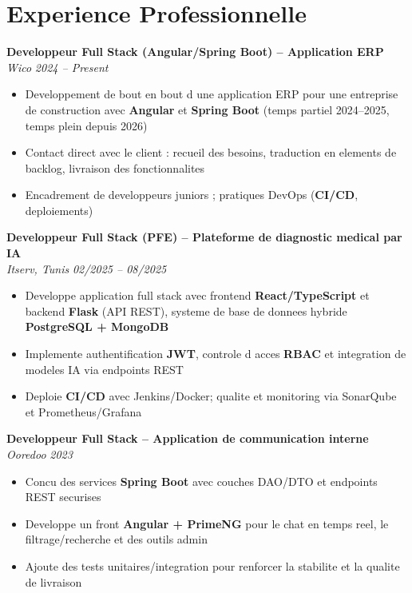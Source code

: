 \documentclass[10pt,a4paper]{article}
\begin{document}
\vspace{6pt}

\section*{Experience Professionnelle}
{\small

\textbf{Developpeur Full Stack (Angular/Spring Boot) -- Application ERP}\\[1pt]
\textit{Wico} \hfill \textit{2024 -- Present}
\begin{itemize}
  \item Developpement de bout en bout d une application ERP pour une entreprise de construction avec \textbf{Angular} et \textbf{Spring Boot} (temps partiel 2024--2025, temps plein depuis 2026)
  \item Contact direct avec le client : recueil des besoins, traduction en elements de backlog, livraison des fonctionnalites
  \item Encadrement de developpeurs juniors ; pratiques DevOps (\textbf{CI/CD}, deploiements)
\end{itemize}

\vspace{3pt}
\textbf{Developpeur Full Stack (PFE) -- Plateforme de diagnostic medical par IA}\\[1pt]
\textit{Itserv, Tunis} \hfill \textit{02/2025 -- 08/2025}
\begin{itemize}
  \item Developpe application full stack avec frontend \textbf{React/TypeScript} et backend \textbf{Flask} (API REST), systeme de base de donnees hybride \textbf{PostgreSQL + MongoDB}
  \item Implemente authentification \textbf{JWT}, controle d acces \textbf{RBAC} et integration de modeles IA via endpoints REST
  \item Deploie \textbf{CI/CD} avec Jenkins/Docker; qualite et monitoring via SonarQube et Prometheus/Grafana
\end{itemize}

\vspace{3pt}
\textbf{Developpeur Full Stack -- Application de communication interne}\\[1pt]
\textit{Ooredoo} \hfill \textit{2023}
\begin{itemize}
  \item Concu des services \textbf{Spring Boot} avec couches DAO/DTO et endpoints REST securises
  \item Developpe un front \textbf{Angular + PrimeNG} pour le chat en temps reel, le filtrage/recherche et des outils admin
  \item Ajoute des tests unitaires/integration pour renforcer la stabilite et la qualite de livraison
\end{itemize}

}
\end{document}
